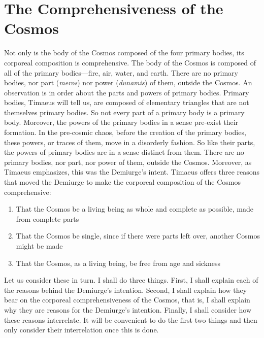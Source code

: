 
\section{The Comprehensiveness of the Cosmos} %
\label{sec:the_comprehensiveness_of_the_Cosmos}

Not only is the body of the Cosmos composed of the four primary bodies, its corporeal composition is comprehensive. The body of the Cosmos is composed of all of the primary bodies---fire, air, water, and earth. There are no primary bodies, nor part (\emph{meros}) nor power (\emph{dunamis}) of them, outside the Cosmos. An observation is in order about the parts and powers of primary bodies. Primary bodies, Timaeus will tell us, are composed of elementary triangles that are not themselves primary bodies. So not every part of a primary body is a primary body. Moreover, the powers of the primary bodies in a sense pre-exist their formation. In the pre-cosmic chaos, before the creation of the primary bodies, these powers, or traces of them, move in a disorderly fashion. So like their parts, the powers of primary bodies are in a sense distinct from them. There are no primary bodies, nor part, nor power of them, outside the Cosmos. Moreover, as Timaeus emphasizes, this was the Demiurge's intent. Timaeus offers three reasons that moved the Demiurge to make the corporeal composition of the Cosmos comprehensive:
\begin{enumerate}[(1)]
	\item That the Cosmos be a living being as whole and complete as possible, made from complete parts
	\item That the Cosmos be single, since if there were parts left over, another Cosmos might be made
	\item That the Cosmos, as a living being, be free from age and sickness
\end{enumerate}
Let us consider these in turn. I shall do three things. First, I shall explain each of the reasons behind the Demiurge's intention. Second, I shall explain how they bear on the corporeal comprehensiveness of the Cosmos, that is, I shall explain why they are reasons for the Demiurge's intention. Finally, I shall consider how these reasons interrelate. It will be convenient to do the first two things and then only consider their interrelation once this is done.


